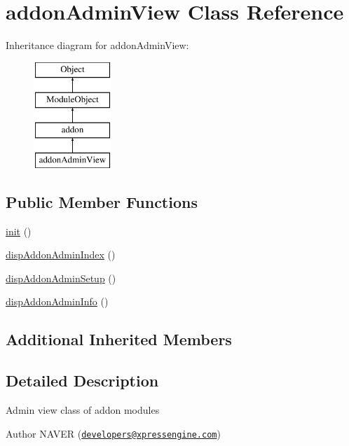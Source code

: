 \hypertarget{classaddonAdminView}{}\section{addon\+Admin\+View Class Reference}
\label{classaddonAdminView}
Inheritance diagram for addon\+Admin\+View\+:\begin{figure}[H]
\begin{center}
\leavevmode
\includegraphics[height=4.000000cm]{classaddonAdminView}
\end{center}
\end{figure}
\subsection*{Public Member Functions}
\begin{DoxyCompactItemize}
\item 
\hyperlink{classaddonAdminView_a2a2cd475d7a4d6111e7e9b3dafb4de01}{init} ()
\item 
\hyperlink{classaddonAdminView_ac460e3c832e8209833bd5f50ab41910c}{disp\+Addon\+Admin\+Index} ()
\item 
\hyperlink{classaddonAdminView_a14aef8b4e451f5eac1872ddc00530d50}{disp\+Addon\+Admin\+Setup} ()
\item 
\hyperlink{classaddonAdminView_a90e6af25e34c4834bd43633da6d83b60}{disp\+Addon\+Admin\+Info} ()
\end{DoxyCompactItemize}
\subsection*{Additional Inherited Members}


\subsection{Detailed Description}
Admin view class of addon modules \begin{DoxyAuthor}{Author}
N\+A\+V\+ER (\href{mailto:developers@xpressengine.com}{\tt developers@xpressengine.\+com}) 
\end{DoxyAuthor}



